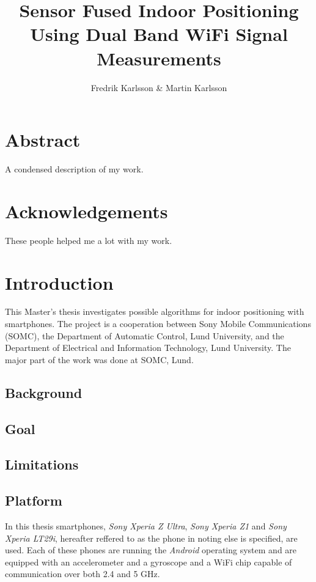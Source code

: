 \documentclass{LTHthesis}
\begin{document}
\begin{titlepages}
\author{Fredrik Karlsson \& Martin Karlsson}
\title{Sensor Fused Indoor Positioning Using Dual Band WiFi Signal Measurements}%
\end{titlepages}
\chapter*{Abstract}
A condensed description of my work.
\chapter*{Acknowledgements}
These people helped me a lot with my work.
\tableofcontents
\chapter{Introduction}

This Master's thesis investigates possible algorithms for indoor positioning with smartphones. The project is a cooperation between Sony Mobile Communications (SOMC), the Department of Automatic Control, Lund University, and the Department of Electrical and Information Technology, Lund University. The major part of the work was done at SOMC, Lund.

\section{Background}



\section{Goal}



\section{Limitations}
\section{Platform}

%
In this thesis smartphones, \emph{Sony Xperia Z Ultra}, \emph{Sony Xperia Z1} and \emph{Sony Xperia LT29i}, hereafter reffered to as the phone in noting else is specified, are used. Each of these phones are running the \emph{Android} operating system and are equipped with an accelerometer and a gyroscope and a WiFi chip capable of communication over both 2.4 and 5 GHz.  
%
\end{document}
